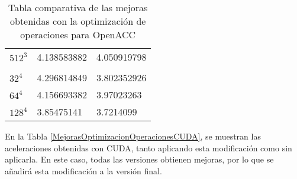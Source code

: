 \begin{table}[H]
\begin{tabular}{lll}
    $512^3$     & 4.138583882                                                                                       & 4.050919798                                                                         \\
         &                                                                                                   &                                                                                     \\
    $32^4 $     & 4.296814849                                                                                       & 3.802352926                                                                         \\
    $64^4 $     & 4.156693382                                                                                       & 3.97023263                                                                          \\
    $128^4$     & 3.85475141                                                                                        & 3.7214099                                                                                                                                                                       
    \end{tabular}
    \caption{Tabla comparativa de las mejoras obtenidas con la optimización de operaciones para OpenACC}
\label{MejorasOptimizacionOperacionesOpenACC}
\end{table}

En la Tabla \ref{MejorasOptimizacionOperacionesCUDA}, se muestran las aceleraciones obtenidas con CUDA, tanto aplicando esta modificación como sin aplicarla. En este caso, todas las versiones obtienen mejoras, por lo que se añadirá esta modificación a la versión final.


